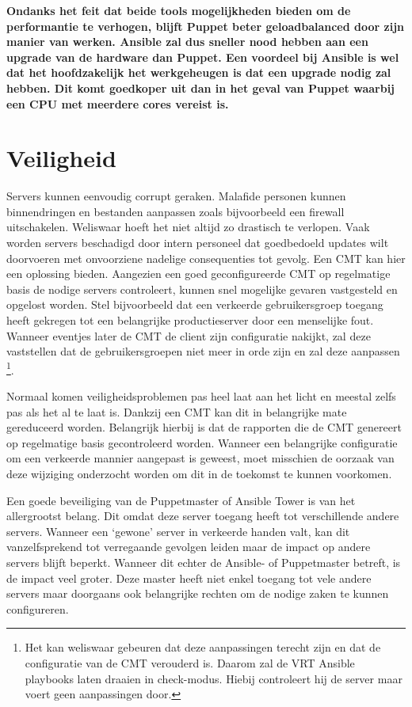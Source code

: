  \textbf{Ondanks het feit dat beide tools mogelijkheden bieden om de performantie te verhogen, blijft Puppet beter geloadbalanced door zijn manier van werken. Ansible zal dus sneller nood hebben aan een upgrade van de hardware dan Puppet. Een voordeel bij Ansible is wel dat het hoofdzakelijk het werkgeheugen is dat een upgrade nodig zal hebben. Dit komt goedkoper uit dan in het geval van Puppet waarbij een CPU met meerdere cores vereist is. }
 

 
 
 \section{Veiligheid}
 \label{sec:veiligheid}
Servers kunnen eenvoudig corrupt geraken. Malafide personen kunnen binnendringen en bestanden aanpassen zoals bijvoorbeeld een firewall uitschakelen. Weliswaar hoeft het niet altijd zo drastisch te verlopen. Vaak worden servers beschadigd door intern personeel dat goedbedoeld updates wilt doorvoeren met onvoorziene nadelige consequenties tot gevolg.
Een \gls{CMT} kan hier een oplossing bieden.  Aangezien een goed geconfigureerde \gls{CMT} op regelmatige basis de nodige servers controleert, kunnen snel mogelijke gevaren vastgesteld en opgelost worden. Stel bijvoorbeeld dat een verkeerde gebruikersgroep toegang heeft gekregen tot een belangrijke productieserver door een menselijke fout. Wanneer eventjes later de \gls{CMT} de client zijn configuratie nakijkt, zal deze vaststellen dat de gebruikersgroepen niet meer in orde zijn en zal deze aanpassen \footnote{Het kan weliswaar gebeuren dat deze aanpassingen terecht zijn en dat de configuratie van de \gls{CMT} verouderd is. Daarom zal de VRT Ansible playbooks laten draaien in check-modus. Hiebij controleert hij de server maar voert geen aanpassingen door.}. 

Normaal komen veiligheidsproblemen pas heel laat aan het licht en meestal zelfs pas als het al te laat is. Dankzij een \gls{CMT} kan dit in belangrijke mate gereduceerd worden. Belangrijk hierbij is dat de rapporten die de \gls{CMT} genereert op regelmatige basis gecontroleerd worden.  Wanneer een belangrijke configuratie om een verkeerde mannier aangepast is geweest, moet misschien de oorzaak van deze wijziging onderzocht worden om dit in de toekomst te kunnen voorkomen.

Een goede beveiliging van de Puppetmaster of Ansible Tower is van het allergrootst belang. Dit omdat deze server toegang heeft tot verschillende andere servers. Wanneer een ‘gewone' server in verkeerde handen valt, kan dit vanzelfsprekend tot verregaande gevolgen leiden maar de impact op andere servers blijft beperkt. Wanneer dit echter de Ansible- of Puppetmaster betreft, is de impact veel groter. Deze master heeft niet enkel toegang tot vele andere servers maar doorgaans ook belangrijke rechten om de nodige zaken te kunnen configureren.


